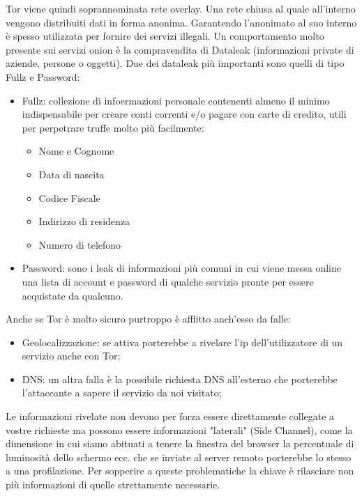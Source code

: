 Tor viene quindi soprannominata rete overlay. Una rete chiusa al quale all'interno vengono distribuiti dati in forma anonima.
Garantendo l'anonimato al suo interno è spesso utilizzata per fornire dei servizi illegali.
Un comportamento molto presente sui servizi onion è la compravendita di Dataleak (informazioni private di aziende, persone o oggetti).
Due dei dataleak più importanti sono quelli di tipo Fullz e Password:
\begin{itemize}
    \item Fullz: collezione di infoermazioni personale contenenti almeno il minimo indispensabile per creare conti correnti e/o pagare con carte di credito, utili per perpetrare truffe molto più facilmente:
    \begin{itemize}
        \item Nome e Cognome
        \item Data di nascita
        \item Codice Fiscale
        \item Indirizzo di residenza
        \item Numero di telefono
    \end{itemize}
    \item Password: sono i leak di informazioni più comuni in cui viene messa online una lista di account e password di qualche servizio pronte per essere acquistate da qualcuno.
\end{itemize}
Anche se Tor è molto sicuro purtroppo è afflitto anch'esso da falle:
\begin{itemize}
    \item Geolocalizzazione: se attiva porterebbe a rivelare l'ip dell'utilizzatore di un servizio anche con Tor;
    \item DNS: un altra falla è la possibile richiesta DNS all'esterno che porterebbe l'attaccante a sapere il servizio da noi visitato;
\end{itemize}
Le informazioni rivelate non devono per forza essere direttamente collegate a vostre richieste ma possono essere informazioni "laterali" (Side Channel), come la dimensione in cui siamo abituati a tenere la finestra del browser la percentuale di luminosità dello schermo ecc. che se inviate al server remoto porterebbe lo stesso a una profilazione.
Per sopperire a queste problematiche la chiave è rilasciare non più informazioni di quelle strettamente necessarie.